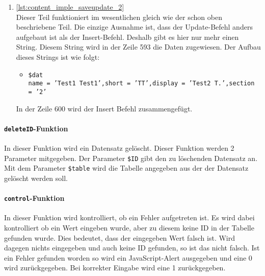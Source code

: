 \begin{enumerate}
\newpage
	
	

	\item \autoref{lst:content_imple_saveupdate_2}\\
	Dieser Teil funktioniert im wesentlichen gleich wie der schon oben beschriebene Teil. Die einzige Ausnahme ist, dass der Update-Befehl anders aufgebaut ist als der Insert-Befehl. Deshalb gibt es hier nur mehr einen String. Diesem String wird in der Zeile 593 die Daten zugewiesen. Der Aufbau dieses Strings ist wie folgt:
	
	\begin{itemize}
		\item  \texttt{\$dat}\\
		\texttt{name = 'Test1 Test1',short = 'TT',display = 'Test2 T.',section = '2'}
	\end{itemize}
	
	In der Zeile 600 wird der Insert Befehl zusammengefügt.
	
	

\end{enumerate}

\paragraph{\texttt{deleteID}-Funktion\\}
In dieser Funktion wird ein Datensatz gelöscht. Dieser Funktion werden 2 Parameter mitgegeben. Der Parameter \texttt{\$ID} gibt den zu löschenden Datensatz an. Mit dem Parameter \texttt{\$table} wird die Tabelle angegeben aus der der Datensatz gelöscht werden soll.



\paragraph{\texttt{control}-Funktion}
\label{sec:content_imple_control}
$ ~~ $\\
In dieser Funktion wird kontrolliert, ob ein Fehler aufgetreten ist. Es wird dabei kontrolliert ob ein Wert eingeben wurde, aber zu diesem keine ID in der Tabelle gefunden wurde. Dies bedeutet, dass der eingegeben Wert falsch ist. Wird dagegen nichts eingegeben und auch keine ID gefunden, so ist das nicht falsch. Ist ein Fehler gefunden worden so wird ein JavaScript-Alert ausgegeben und eine 0 wird zurückgegeben. Bei korrekter Eingabe wird eine 1 zurückgegeben.

